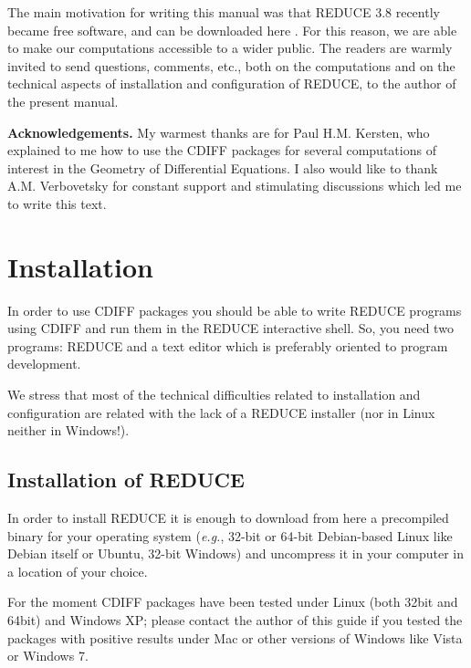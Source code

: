 \documentclass[12pt]{amsart}
\theoremstyle{definition}
\newcommand{\cdiff}{CDIFF\xspace}
\newcommand{\reduce}{REDUCE\xspace}
\begin{document}
The main motivation for writing this manual was that \reduce 3.8 recently became
free software, and can be downloaded here \cite{red}. For this reason, we are
able to make our computations accessible to a wider public. The readers are
warmly invited to send questions, comments, etc., both on the computations and
on the technical aspects of installation and configuration of \reduce, to the
author of the present manual.

\textbf{Acknowledgements.} My warmest thanks are for Paul H.M. Kersten, who
explained to me how to use the \cdiff packages for several computations of
interest in the Geometry of Differential Equations. I also would like to thank
A.M. Verbovetsky for constant support and stimulating discussions which led me
to write this text.

\section{Installation}

In order to use \cdiff packages you should be able to write \reduce programs
using \cdiff and run them in the \reduce interactive shell. So, you need two
programs: \reduce and a text editor which is preferably oriented to program
development.

We stress that most of the technical difficulties related to installation and
configuration are related with the lack of a \reduce installer (nor in Linux
neither in Windows!).

\subsection{Installation of \reduce}
\label{sec:installation-reduce}

In order to install \reduce it is enough to download from here \cite{red} a
precompiled binary for your operating system (\emph{e.g.}, 32-bit or 64-bit
Debian-based Linux like Debian itself or Ubuntu, 32-bit Windows) and uncompress
it in your computer in a location of your choice.

For the moment \cdiff packages have been tested under Linux (both 32bit and
64bit) and Windows XP; please contact the author of this guide if you tested
the packages with positive results under Mac or other versions of Windows like
Vista or Windows 7.
\end{document}
